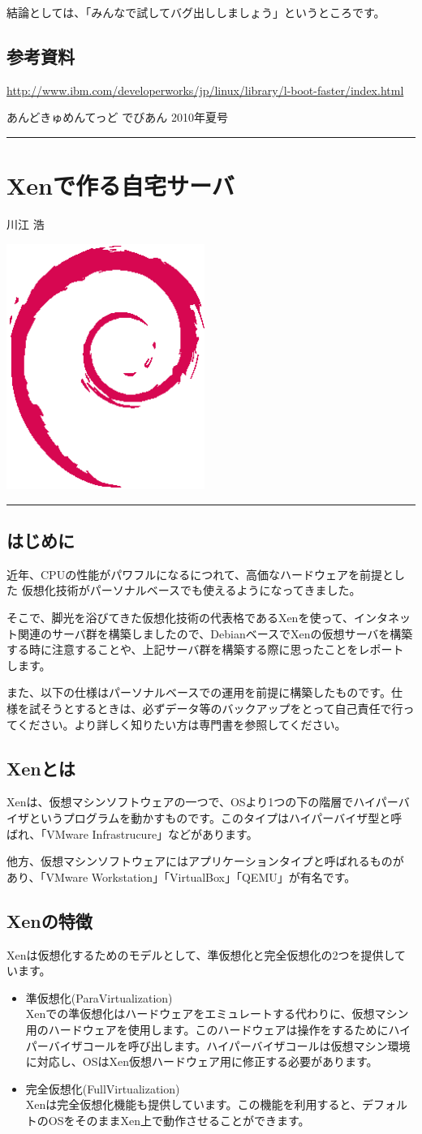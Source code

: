 \documentclass[mingoth,a4paper]{jsarticle}
\renewcommand{\dancersection}[2]{%
\newpage
あんどきゅめんてっど でびあん 2010年夏号
%
\vspace{0.1mm}\\
{\color{dancerlightblue}\rule{\hsize}{2mm}}

%
%
\begin{minipage}[t]{0.6\hsize}
\color{dancerdarkblue}
\vspace{1cm}
\section{#1}
\hfill{}#2\\
\end{minipage}
\begin{minipage}[t]{0.4\hsize}
\vspace{-2cm}
\hfill{}\includegraphics[height=8cm]{image200502/openlogo-nd.eps}\\
\vspace{-5cm}
\end{minipage}
%
%
{\color{dancerdarkblue}\rule{0.74\hsize}{2mm}}
%
\vspace{2cm}
}
\begin{document}
結論としては、「みんなで試してバグ出ししましょう」というところです。

\subsection{参考資料}

\url{http://www.ibm.com/developerworks/jp/linux/library/l-boot-faster/index.html}
\clearpage

\dancersection{Xenで作る自宅サーバ}{川江 浩}

\subsection{はじめに}
近年、CPUの性能がパワフルになるにつれて、高価なハードウェアを前提とした
仮想化技術がパーソナルベースでも使えるようになってきました。

そこで、脚光を浴びてきた仮想化技術の代表格であるXenを使って、インタネッ
ト関連のサーバ群を構築しましたので、DebianベースでXenの仮想サーバを構築
する時に注意することや、上記サーバ群を構築する際に思ったことをレポート
します。

また、以下の仕様はパーソナルベースでの運用を前提に構築したものです。仕
様を試そうとするときは、必ずデータ等のバックアップをとって自己責任で行っ
てください。より詳しく知りたい方は専門書を参照してください。

\subsection{Xenとは}
Xenは、仮想マシンソフトウェアの一つで、OSより1つの下の階層でハイパーバ
イザというプログラムを動かすものです。このタイプはハイパーバイザ型と呼
ばれ、「VMware Infrastrucure」などがあります。

他方、仮想マシンソフトウェアにはアプリケーションタイプと呼ばれるものが
あり、「VMware Workstation」「VirtualBox」「QEMU」が有名です。

\subsection{Xenの特徴}
Xenは仮想化するためのモデルとして、準仮想化と完全仮想化の2つを提供しています。
\begin{itemize}
\item 準仮想化(ParaVirtualization)\\
Xenでの準仮想化はハードウェアをエミュレートする代わりに、仮想マシン用のハードウェアを使用します。このハードウェアは操作をするためにハイパーバイザコールを呼び出します。ハイパーバイザコールは仮想マシン環境に対応し、OSはXen仮想ハードウェア用に修正する必要があります。

\item 完全仮想化(FullVirtualization)\\
Xenは完全仮想化機能も提供しています。この機能を利用すると、デフォルトのOSをそのままXen上で動作させることができます。
\end{itemize}
\end{document}
